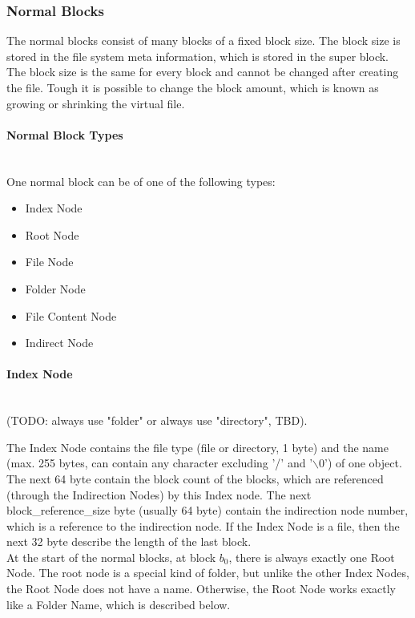 \documentclass[JCDReport.tex]{subfiles}
\begin{document}
\subsubsection{Normal Blocks}

The normal blocks consist of many blocks of a fixed block size. The block size is stored in the file system meta information, which is stored in the super block. The block size is the same for every block and cannot be changed after creating the file. Tough it is possible to change the block amount, which is known as growing or shrinking the virtual file.

\paragraph{Normal Block Types} ~\\

\noindent One normal block can be of one of the following types:

\begin{itemize}
  \item Index Node
    \item Root Node
    \item File Node
    \item Folder Node
  \item File Content Node
  \item Indirect Node
\end{itemize}

\paragraph{Index Node} ~\\

(TODO: always use "folder" or always use "directory", TBD).

The Index Node contains the file type (file or directory, 1 byte) and the name (max. 255 bytes, can contain any character excluding '/' and '$\backslash0$') of one object. The next 64 byte contain the block count of the blocks, which are referenced  (through the Indirection Nodes) by this Index node. The next block\_reference\_size byte (usually 64 byte) contain the indirection node number, which is a reference to the indirection node. If the Index Node is a file, then the next 32 byte describe the length of the last block.\\


At the start of the normal blocks, at block $b_{0}$, there is always exactly one Root Node. The root node is a special kind of folder, but unlike the other Index Nodes, the Root Node does not have a name. Otherwise, the Root Node works exactly like a Folder Name, which is described below.\\
\end{document}
